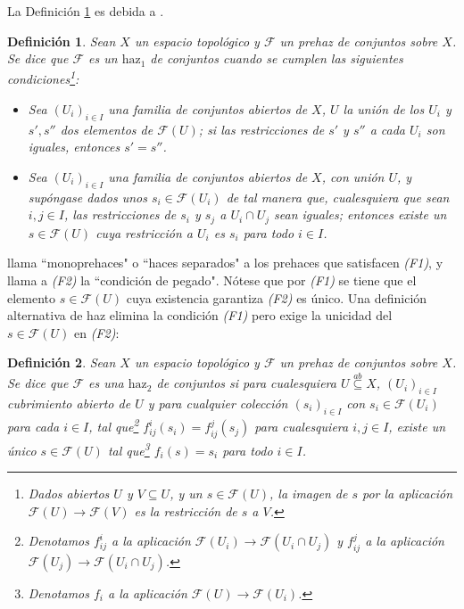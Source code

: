 \documentclass[letterpaper]{article} %
\date{}
\newtheorem{Def}{Definición}
\newcommand{\subseteqab}{\stackrel{ab}{\subseteq}}
\renewenvironment{abstract}
{\small
   \list{}{%
      \setlength{\leftmargin}{1.4cm}%
      \setlength{\rightmargin}{\leftmargin}%
   }%
   \item\relax}
{\endlist}
\begin{document}
   
   \vspace{1cm}


   La Definición \ref{def:Godement} es debida a \cite[p.~109]{TATF}. 

   \begin{Def}\label{def:Godement}
      Sean $X$ un espacio topológico y $\mathscr{F}$ un prehaz de conjuntos sobre $X$. Se dice que $\mathscr{F}$ es un ${\text{haz}_1}$ de conjuntos cuando se cumplen las siguientes condiciones\footnote{Dados abiertos $U$ y $V\subseteq U$, y un $s\in\mathscr{F}(U)$, la imagen de $s$ por la aplicación $\mathscr{F}(U)\to\mathscr{F}(V)$ es la restricción de $s$ a $V$.}:
      \begin{itemize}
         \item[(F1):] Sea $(U_i)_{i\in I}$ una familia de conjuntos abiertos de $X$, $U$ la unión de los $U_i$ y $s',s''$ dos elementos de $\mathscr{F}(U)$; si las restricciones de $s'$ y $s''$ a cada $U_i$ son iguales, entonces $s'=s''$.
         \item[(F2):] Sea $(U_i)_{i\in I}$ una familia de conjuntos abiertos de $X$, con unión $U$, y supóngase dados unos $s_i\in \mathscr{F}(U_i)$ de tal manera que, cualesquiera que sean $i,j\in I$, las restricciones de $s_i$ y $s_j$ a $U_i\cap U_j$ sean iguales; entonces existe un $s\in \mathscr{F}(U)$ cuya restricción a $U_i$ es $s_i$ para todo $i\in I$.
      \end{itemize}
   \end{Def}

   \cite[p,~14]{ST} llama ``monoprehaces" o ``haces separados" a los prehaces que satisfacen \textit{(F1)}, y llama a \textit{(F2)} la ``condición de pegado". Nótese que por \textit{(F1)} se tiene que el elemento $s\in \mathscr{F}(U)$ cuya existencia garantiza \textit{(F2)} es único. Una definición alternativa de haz elimina la condición \textit{(F1)} pero exige la unicidad del $s\in \mathscr{F}(U)$ en \textit{(F2)}:

   \begin{Def}
      Sean $X$ un espacio topológico y $\mathscr{F}$ un prehaz de conjuntos sobre $X$. Se dice que $\mathscr{F}$ es una $\text{haz}_2$ de conjuntos si para cualesquiera $U\subseteqab X$, $(U_i)_{i\in I}$ cubrimiento abierto de $U$ y para cualquier colección $(s_i)_{i\in I}$ con $s_i\in \mathscr{F}(U_i)$ para cada $i\in I$, tal que\footnote{Denotamos $f^i_{ij}$ a la aplicación $\mathscr{F}(U_i)\to\mathscr{F}(U_i\cap U_j)$ y $f^j_{ij}$ a la aplicación $\mathscr{F}(U_j)\to\mathscr{F}(U_i\cap U_j)$.} $f^i_{ij}(s_i)=f^j_{ij}(s_j)$ para cualesquiera $i,j\in I$, existe un único $s\in \mathscr{F}(U)$ tal que\footnote{Denotamos $f_i$ a la aplicación $\mathscr{F}(U)\to\mathscr{F}(U_i)$.} $f_i(s)=s_i$ para todo $i\in I$. 
   \end{Def}
\end{document}
